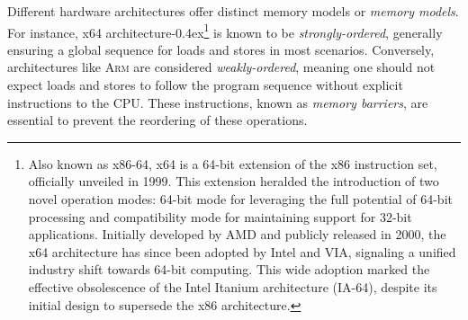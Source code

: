 \documentclass[fontsize=10pt, oneside]{scrartcl}
\newcommand{\punckern}{\kern-0.4ex}
\newcommand{\introduce}[1]{\textit{#1}}
\begin{document}
Different hardware architectures offer distinct memory models or \introduce{memory models}.
For instance, x64 architecture\punckern\footnote{%
Also known as x86-64, x64 is a 64-bit extension of the x86 instruction set, officially unveiled in 1999.
This extension heralded the introduction of two novel operation modes:
64-bit mode for leveraging the full potential of 64-bit processing and compatibility mode for maintaining support for 32-bit applications.
Initially developed by AMD and publicly released in 2000, the x64 architecture has since been adopted by Intel and VIA,
signaling a unified industry shift towards 64-bit computing.
This wide adoption marked the effective obsolescence of the Intel Itanium architecture (IA-64),
despite its initial design to supersede the x86 architecture.
} is known to be \introduce{strongly-ordered},
generally ensuring a global sequence for loads and stores in most scenarios.
Conversely, architectures like \textsc{Arm} are considered \introduce{weakly-ordered},
meaning one should not expect loads and stores to follow the program sequence without explicit instructions to the \textsc{CPU}.
These instructions, known as \introduce{memory barriers}, are essential to prevent the reordering of these operations.
\end{document}
